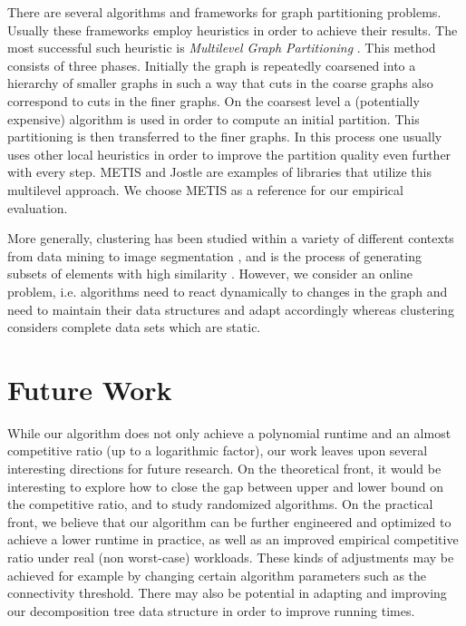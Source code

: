 \documentclass[a4paper,UKenglish,cleveref, autoref, thm-restate,authorcolumns]{lipics-v2019}
\begin{document}
There are several algorithms and frameworks for graph partitioning problems. Usually these frameworks employ heuristics in order to achieve their results. The most successful such heuristic is \textit{Multilevel Graph Partitioning} \cite{Buluc2016}. This method consists of three phases. Initially the graph is repeatedly coarsened into a hierarchy of smaller graphs in such a way that cuts in the coarse graphs also correspond to cuts in the finer graphs. On the coarsest level a (potentially expensive) algorithm is used in order to compute an initial partition. This partitioning is then transferred to the finer graphs. In this process one usually uses other local heuristics in order to improve the partition quality even further with every step.
METIS \cite{Karypis1998, Karypis1998a} and Jostle \cite{Walshaw2000, walshaw2007jostle} are examples of libraries that utilize this multilevel approach. We choose METIS as a reference for our empirical evaluation.

More generally, clustering has been studied within a variety of
different contexts 
from data mining to image segmentation \cite{Benabdellah2019, Wu1993, Pavana},
and is the process of generating subsets of elements with high similarity 
\cite{Hartuv2000}. 
However, we consider an online problem, i.e. algorithms need to react dynamically to changes in the graph and need to maintain their data structures and adapt accordingly whereas clustering considers complete data sets which are static.

\section{Future Work}
	\label{sec:future_work}
	
While our algorithm does not only achieve a polynomial runtime
and an almost competitive ratio (up to a logarithmic factor),
our work leaves upon several interesting directions for future
research. 
On the theoretical front, it would be interesting to explore
how to close the gap between upper and lower bound
on the competitive ratio, and to study randomized algorithms.
On the practical front, we believe that our algorithm can
be further engineered and optimized to achieve a lower runtime
in practice, as well as an improved empirical competitive ratio
under real (non worst-case) workloads.
These kinds of adjustments may be achieved for example by changing certain algorithm parameters such as the connectivity threshold.
There may also be potential in adapting and improving our decomposition tree data structure in order to improve running times.
\end{document}
